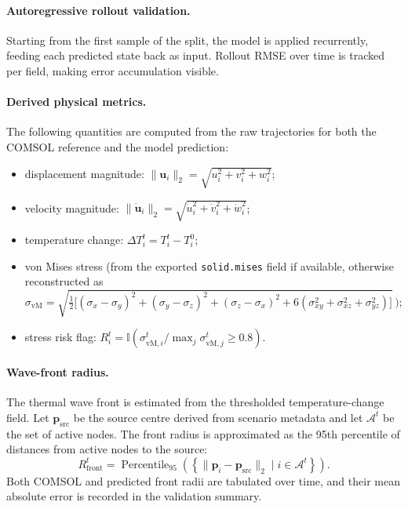 \paragraph{Autoregressive rollout validation.}
Starting from the first sample of the split, the model is applied
recurrently, feeding each predicted state back as input.
Rollout RMSE over time is tracked per field, making error accumulation
visible.

\paragraph{Derived physical metrics.}
The following quantities are computed from the raw trajectories for both the
COMSOL reference and the model prediction:

\begin{itemize}
  \item displacement magnitude:
        \(\|\mathbf{u}_i\|_2 = \sqrt{u_i^2+v_i^2+w_i^2}\);
  \item velocity magnitude:
        \(\|\dot{\mathbf{u}}_i\|_2 = \sqrt{\dot{u}_i^2+\dot{v}_i^2+\dot{w}_i^2}\);
  \item temperature change:
        \(\Delta T_i^t = T_i^t - T_i^{0}\);
  \item von Mises stress (from the exported \texttt{solid.mises} field if
        available, otherwise reconstructed as
        \[
          \sigma_{\mathrm{vM}}
          = \sqrt{
              \tfrac{1}{2}
              \bigl[
                (\sigma_x\!-\!\sigma_y)^2
                +(\sigma_y\!-\!\sigma_z)^2
                +(\sigma_z\!-\!\sigma_x)^2
                +6(\sigma_{xy}^2+\sigma_{xz}^2+\sigma_{yz}^2)
              \bigr]
            }
        \,\text{);}
  \]
  \item stress risk flag:
        \(R_i^t = \mathbb{I}\!\left(
            \sigma_{\mathrm{vM},i}^t / \max_j \sigma_{\mathrm{vM},j}^t
            \ge 0.8
          \right)\).
\end{itemize}

\paragraph{Wave-front radius.}
The thermal wave front is estimated from the thresholded temperature-change
field.
Let \(\mathbf{p}_{\mathrm{src}}\) be the source centre derived from
scenario metadata and let \(\mathcal{A}^t\) be the set of active nodes.
The front radius is approximated as the 95th percentile of distances from
active nodes to the source:
\[
  R_{\mathrm{front}}^t
  = \operatorname{Percentile}_{95}\!\left(
      \left\{
        \|\mathbf{p}_i - \mathbf{p}_{\mathrm{src}}\|_2
        \mid i\in\mathcal{A}^t
      \right\}
    \right).
\]
Both COMSOL and predicted front radii are tabulated over time, and their
mean absolute error is recorded in the validation summary.

